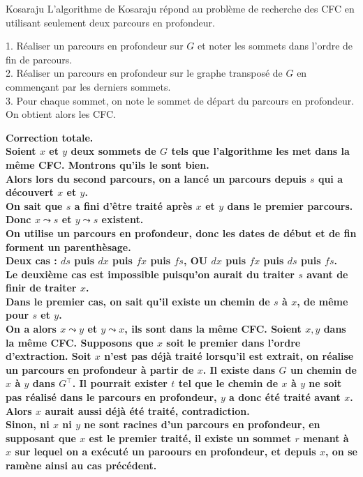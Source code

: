 \documentclass[french, 11pt]{article}
\begin{document}
\begin{defi}{Kosaraju}{}
    L'algorithme de Kosaraju répond au problème de recherche des CFC en utilisant seulement deux parcours en profondeur.\\
    \begin{algorithm}[H]
        \caption{Algorithme de Kosaraju}
        1. Réaliser un parcours en profondeur sur $G$ et noter les sommets dans l'ordre de fin de parcours.\\
        2. Réaliser un parcours en profondeur sur le graphe transposé de $G$ en commençant par les derniers sommets.\\
        3. Pour chaque sommet, on note le sommet de départ du parcours en profondeur.\\
        On obtient alors les CFC.
    \end{algorithm}
    \bf{Correction totale.}\\
    Soient $x$ et $y$ deux sommets de $G$ tels que l'algorithme les met dans la même CFC. Montrons qu'ils le sont bien.\\
    Alors lors du second parcours, on a lancé un parcours depuis $s$ qui a découvert $x$ et $y$.\\
    On sait que $s$ a fini d'être traité après $x$ et $y$ dans le premier parcours. Donc $x\leadsto s$ et $y\leadsto s$ existent.\\
    On utilise un parcours en profondeur, donc les dates de début et de fin forment un parenthèsage.\\
    Deux cas : $ds$ puis $dx$ puis $fx$ puis $fs$, OU $dx$ puis $fx$ puis $ds$ puis $fs$.\\
    Le deuxième cas est impossible puisqu'on aurait du traiter $s$ avant de finir de traiter $x$.\\
    Dans le premier cas, on sait qu'il existe un chemin de $s$ à $x$, de même pour $s$ et $y$.\\
    On a alors $x\leadsto y$ et $y\leadsto x$, ils sont dans la même CFC.\n
    Soient $x,y$ dans la même CFC. Supposons que $x$ soit le premier dans l'ordre d'extraction. Soit $x$ n'est pas déjà traité lorsqu'il est extrait, on réalise un parcours en profondeur à partir de $x$. Il existe dans $G$ un chemin de $x$ à $y$ dans $G^\top$. Il pourrait exister $t$ tel que le chemin de $x$ à $y$ ne soit pas réalisé dans le parcours en profondeur, $y$ a donc été traité avant $x$. Alors $x$ aurait aussi déjà été traité, contradiction.\\
    Sinon, ni $x$ ni $y$ ne sont racines d'un parcours en profondeur, en supposant que $x$ est le premier traité, il existe un sommet $r$ menant à $x$ sur lequel on a exécuté un paroours en profondeur, et depuis $x$, on se ramène ainsi au cas précédent.
\end{defi}
\end{document}

